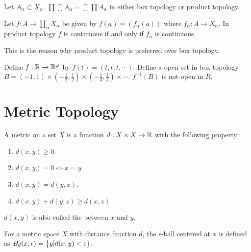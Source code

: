 \begin{theorem}
Let $A_{\alpha} \subset X_{\alpha}$. $\displaystyle \prod \closure{A_{\alpha}} = \closure{\prod A_{\alpha}}$ in either box topology or product topology.
\end{theorem}


\begin{theorem}
Let $\displaystyle f : A \rightarrow \prod_{\alpha} X_{\alpha}$ be given by $f(a) = \left( f_{\alpha}(a) \right)$ where $f_{\alpha} : A \rightarrow X_{\alpha}$. In product topology $f$ is continuous if and only if $f_{\alpha}$ is continuous.

This is the reason why product topology is preferred over box topology.
\end{theorem}

\begin{example}
    Define $f: \mathbb{R} \rightarrow \mathbb{R}^{\omega}$ by $f(t) = (t,t,t, \cdots)$. Define a open set in box topology $B = (-1, 1) \times (- \frac{1}{2}, \frac{1}{2}) \times  (- \frac{1}{3}, \frac{1}{3}) \times \cdots$. $f^{-1}(B)$ is not open in $R$.
\end{example}

\section{Metric Topology}

\begin{definition}
    A metric on a set $X$ is a function $d: X \times X \rightarrow \mathbb{R}$ with the following property:
    \begin{enumerate}
        \item $d(x,y) \geq 0$.
        \item $d(x,y) = 0 \Leftrightarrow x = y$.
        \item $d(x,y) = d(y,x)$.
        \item $d(x,y) + d(y,z) \geq d(x,z)$.
    \end{enumerate}
    
    $d(x,y)$ is also called the  between $x$ and $y$.
\end{definition}

\begin{definition}
    For a metric space $X$ with distance function $d$, the $\epsilon$-ball centered at $x$ is defined as $B_d(x, \epsilon) = \set{y | d(x,y) < \epsilon}$.
\end{definition}

